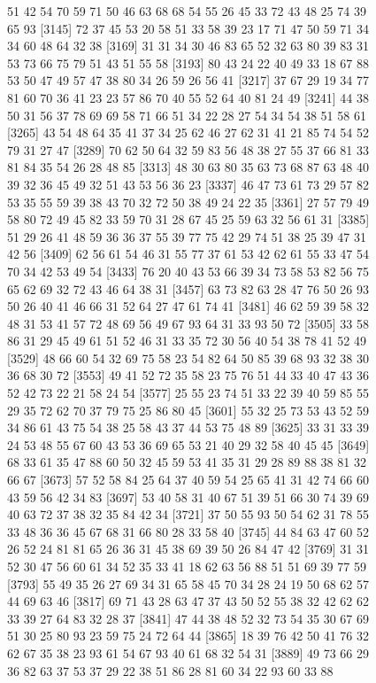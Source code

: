\documentclass{article}
\begin{document}
\begin{figure}[H]
\begin{Schunk}
\begin{Soutput}
 [3121] 51 42 54 70 59 71 50 46 63 68 68 54 55 26 45 33 72 43 48 25 74 39 65 93
 [3145] 72 37 45 53 20 58 51 33 58 39 23 17 71 47 50 59 71 34 34 60 48 64 32 38
 [3169] 31 31 34 30 46 83 65 52 32 63 80 39 83 31 53 73 66 75 79 51 43 51 55 58
 [3193] 80 43 24 22 40 49 33 18 67 88 53 50 47 49 57 47 38 80 34 26 59 26 56 41
 [3217] 37 67 29 19 34 77 81 60 70 36 41 23 23 57 86 70 40 55 52 64 40 81 24 49
 [3241] 44 38 50 31 56 37 78 69 69 58 71 66 51 34 22 28 27 54 34 54 38 51 58 61
 [3265] 43 54 48 64 35 41 37 34 25 62 46 27 62 31 41 21 85 74 54 52 79 31 27 47
 [3289] 70 62 50 64 32 59 83 56 48 38 27 55 37 66 81 33 81 84 35 54 26 28 48 85
 [3313] 48 30 63 80 35 63 73 68 87 63 48 40 39 32 36 45 49 32 51 43 53 56 36 23
 [3337] 46 47 73 61 73 29 57 82 53 35 55 59 39 38 43 70 32 72 50 38 49 24 22 35
 [3361] 27 57 79 49 58 80 72 49 45 82 33 59 70 31 28 67 45 25 59 63 32 56 61 31
 [3385] 51 29 26 41 48 59 36 36 37 55 39 77 75 42 29 74 51 38 25 39 47 31 42 56
 [3409] 62 56 61 54 46 31 55 77 37 61 53 42 62 61 55 33 47 54 70 34 42 53 49 54
 [3433] 76 20 40 43 53 66 39 34 73 58 53 82 56 75 65 62 69 32 72 43 46 64 38 31
 [3457] 63 73 82 63 28 47 76 50 26 93 50 26 40 41 46 66 31 52 64 27 47 61 74 41
 [3481] 46 62 59 39 58 32 48 31 53 41 57 72 48 69 56 49 67 93 64 31 33 93 50 72
 [3505] 33 58 86 31 29 45 49 61 51 52 46 31 33 35 72 30 56 40 54 38 78 41 52 49
 [3529] 48 66 60 54 32 69 75 58 23 54 82 64 50 85 39 68 93 32 38 30 36 68 30 72
 [3553] 49 41 52 72 35 58 23 75 76 51 44 33 40 47 43 36 52 42 73 22 21 58 24 54
 [3577] 25 55 23 74 51 33 22 39 40 59 85 55 29 35 72 62 70 37 79 75 25 86 80 45
 [3601] 55 32 25 73 53 43 52 59 34 86 61 43 75 54 38 25 58 43 37 44 53 75 48 89
 [3625] 33 31 33 39 24 53 48 55 67 60 43 53 36 69 65 53 21 40 29 32 58 40 45 45
 [3649] 68 33 61 35 47 88 60 50 32 45 59 53 41 35 31 29 28 89 88 38 81 32 66 67
 [3673] 57 52 58 84 25 64 37 40 59 54 25 65 41 31 42 74 66 60 43 59 56 42 34 83
 [3697] 53 40 58 31 40 67 51 39 51 66 30 74 39 69 40 63 72 37 38 32 35 84 42 34
 [3721] 37 50 55 93 50 54 62 31 78 55 33 48 36 36 45 67 68 31 66 80 28 33 58 40
 [3745] 44 84 63 47 60 52 26 52 24 81 81 65 26 36 31 45 38 69 39 50 26 84 47 42
 [3769] 31 31 52 30 47 56 60 61 34 52 35 33 41 18 62 63 56 88 51 51 69 39 77 59
 [3793] 55 49 35 26 27 69 34 31 65 58 45 70 34 28 24 19 50 68 62 57 44 69 63 46
 [3817] 69 71 43 28 63 47 37 43 50 52 55 38 32 42 62 62 33 39 27 64 83 32 28 37
 [3841] 47 44 38 48 52 32 73 54 35 30 67 69 51 30 25 80 93 23 59 75 24 72 64 44
 [3865] 18 39 76 42 50 41 76 32 62 67 35 38 23 93 61 54 67 93 40 61 68 32 54 31
 [3889] 49 73 66 29 36 82 63 37 53 37 29 22 38 51 86 28 81 60 34 22 93 60 33 88

\end{Soutput}
\end{Schunk}
\end{figure}
\end{document}
